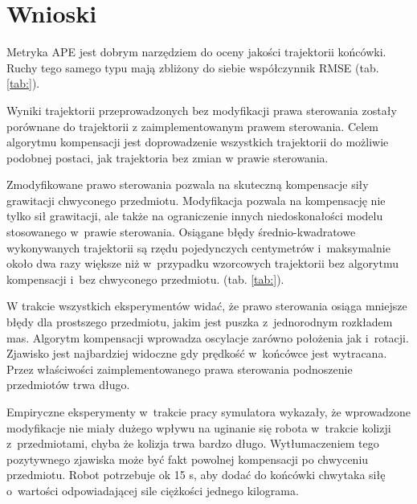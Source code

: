 \section{Wnioski}

Metryka APE jest dobrym narzędziem do oceny jakości trajektorii końcówki. Ruchy tego samego typu mają zbliżony do siebie współczynnik RMSE (tab. \ref{tab:}). 

Wyniki trajektorii przeprowadzonych bez modyfikacji prawa sterowania zostały porównane do trajektorii z zaimplementowanym prawem sterowania. Celem algorytmu kompensacji jest doprowadzenie wszystkich trajektorii do możliwie podobnej postaci, jak trajektoria bez zmian w prawie sterowania. 

Zmodyfikowane prawo sterowania pozwala na skuteczną kompensacje siły grawitacji chwyconego przedmiotu. Modyfikacja pozwala na kompensację nie tylko sił grawitacji, ale także na ograniczenie innych niedoskonałości modelu stosowanego w~prawie sterowania. Osiągane błędy średnio-kwadratowe wykonywanych trajektorii są rzędu pojedynczych centymetrów i~maksymalnie około dwa razy większe niż w~przypadku wzorcowych trajektorii bez algorytmu kompensacji i~bez chwyconego przedmiotu. (tab. \ref{tab:}). 

W trakcie wszystkich eksperymentów widać, że prawo sterowania osiąga mniejsze błędy dla prostszego przedmiotu, jakim jest puszka z~jednorodnym rozkładem mas. Algorytm kompensacji wprowadza oscylacje zarówno położenia jak i~rotacji. Zjawisko jest najbardziej widoczne gdy prędkość w~końcówce jest wytracana. Przez właściwości zaimplementowanego prawa sterowania podnoszenie przedmiotów trwa długo. 

Empiryczne eksperymenty w~trakcie pracy symulatora wykazały, że wprowadzone modyfikacje nie miały dużego wpływu na uginanie się robota w~trakcie kolizji z~przedmiotami, chyba że kolizja trwa bardzo długo. Wytłumaczeniem tego pozytywnego zjawiska może być fakt powolnej kompensacji po chwyceniu przedmiotu. Robot potrzebuje ok 15 s, aby dodać do końcówki chwytaka siłę o~wartości odpowiadającej sile ciężkości jednego kilograma. 

